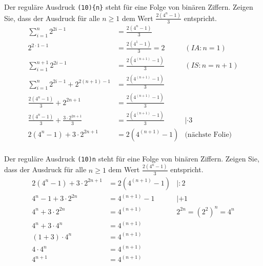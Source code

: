 \begin{card}
  Der reguläre Ausdruck \texttt{(10)\{n\}} steht für eine Folge von binären Ziffern. Zeigen Sie, dass der Ausdruck für alle
  $n \geq 1$ dem Wert $\frac{2(4^n - 1)}{3}$ entspricht.
  \hr
  \begin{align*}
    \sum\limits_{i=1}^{n} 2^{2i-1} &= \frac{2(4^n - 1)}{3} & \\
    2^{2 \cdot 1 - 1} &= \frac{2(4^1 - 1)}{3} = 2 & (IA: n=1) \\
    \sum\limits_{i=1}^{n+1} 2^{2i-1} &= \frac{2(4^{(n+1)} - 1)}{3} & (IS: n=n+1) \\
    \sum\limits_{i=1}^{n} 2^{2i-1} + 2^{2(n+1) - 1} &= \frac{2(4^{(n+1)} - 1)}{3} & \\
    \frac{2(4^{n} - 1)}{3} + 2^{2n+1} &= \frac{2(4^{(n+1)} - 1)}{3} & \\
    \frac{2(4^{n} - 1)}{3} + \frac{3 \cdot 2^{2n+1}}{3} &= \frac{2(4^{(n+1)} - 1)}{3} & |\cdot 3 \\
    2(4^{n} - 1) + 3 \cdot 2^{2n+1} &= 2(4^{(n+1)} - 1) & \text{(nächste Folie)} \\
  \end{align*}
\end{card}

\begin{card}
  Der reguläre Ausdruck \texttt{(10){n}} steht für eine Folge von binären Ziffern. Zeigen Sie, dass der Ausdruck für alle
  $n \geq 1$ dem Wert $\frac{2(4^n - 1)}{3}$ entspricht.
  \hr
  \begin{align*}
    2(4^{n} - 1) + 3 \cdot 2^{2n+1} &= 2(4^{(n+1)} - 1) & |:2 \\
    4^{n} - 1 + 3 \cdot 2^{2n} &= 4^{(n+1)} - 1 & |+1 \\
    4^{n} + 3 \cdot 2^{2n} &= 4^{(n+1)} & 2^{2n} = \left(2^2 \right)^n = 4^n \\
    4^{n} + 3 \cdot 4^n &= 4^{(n+1)} & \\
    (1+3) \cdot 4^{n} &= 4^{(n+1)} & \\
    4 \cdot 4^{n} &= 4^{(n+1)} & \\
    4^{n+1} &= 4^{(n+1)} & \\
  \end{align*}
\end{card}

